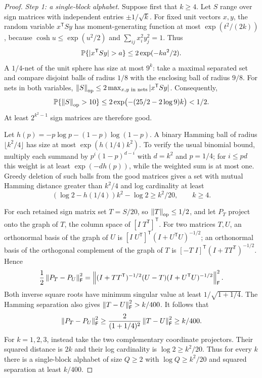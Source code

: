 \begin{proof}
\emph{Step 1: a single-block alphabet.}
Suppose first that $k\ge4$. Let $S$ range over sign matrices with independent
entries $\pm1/\sqrt{k}$. For fixed unit vectors $x,y$, the random variable
$x^{\mathsf T}Sy$ has moment-generating function at most
$\exp(t^2/(2k))$, because $\cosh u\le\exp(u^2/2)$ and
$\sum_{ij}x_i^2y_j^2=1$. Thus
\[
 \Prob\{|x^{\mathsf T}Sy|>a\}\le2\exp(-ka^2/2).
\]
A $1/4$-net of the unit sphere has size at most $9^k$: take a maximal separated
set and compare disjoint balls of radius $1/8$ with the enclosing ball of
radius $9/8$. For nets in both variables,
$\left\lVert S\right\rVert_{\mathrm{op}}\le2\max_{x,y\text{ in nets}}|x^{\mathsf T}Sy|$.
Consequently,
\[
 \mathbb P\{\left\lVert S\right\rVert_{\mathrm{op}}>10\}
 \le2\exp\bigl(-(25/2-2\log9)k\bigr)<1/2.
\]
At least $2^{k^2-1}$ sign matrices are therefore good.

Let $h(p)=-p\log p-(1-p)\log(1-p)$. A binary Hamming ball of radius
$\lfloor k^2/4\rfloor$ has size at most $\exp(h(1/4)k^2)$. To verify the usual
binomial bound, multiply each summand by
$p^i(1-p)^{d-i}$ with $d=k^2$ and $p=1/4$; for $i\le pd$ this weight is at
least $\exp(-dh(p))$, while the weighted sum is at most one.
Greedy deletion of such balls from the good matrices gives a set with mutual
Hamming distance greater than $k^2/4$ and log cardinality at least
\[
 (\log2-h(1/4))k^2-\log2\ge k^2/20,\qquad k\ge4.
\]

For each retained sign matrix set $T=S/20$, so $\left\lVert T\right\rVert_{\mathrm{op}}\le1/2$, and let
$P_T$ project onto the graph of $T$, the column space of
$[I\;T^{\mathsf T}]^{\mathsf T}$. For two matrices $T,U$, an orthonormal basis
of the graph of $U$ is
$[I\;U^{\mathsf T}]^{\mathsf T}(I+U^{\mathsf T}U)^{-1/2}$; an orthonormal
basis of the orthogonal complement of the graph of $T$ is
$[-T\;I]^{\mathsf T}(I+TT^{\mathsf T})^{-1/2}$. Hence
\begin{align}\label{eq:graphidentity}
 \frac12\left\lVert P_T-P_U\right\rVert_{\mathsf F}^2
 =\left\lVert (I+TT^{\mathsf T})^{-1/2}(U-T)
          (I+U^{\mathsf T}U)^{-1/2}\right\rVert_{\mathsf F}^2.
\end{align}
Both inverse square roots have minimum singular value at least
$1/\sqrt{1+1/4}$. The Hamming separation also gives
$\left\lVert T-U\right\rVert_{\mathsf F}^2>k/400$. It follows that
\[
 \left\lVert P_T-P_U\right\rVert_{\mathsf F}^2
 \ge\frac{2}{(1+1/4)^2}\left\lVert T-U\right\rVert_{\mathsf F}^2\ge k/400.
\]
For $k=1,2,3$, instead take the two complementary coordinate projectors.
Their squared distance is $2k$ and their log cardinality is $\log2\ge k^2/20$.
Thus for every $k$ there is a single-block alphabet of size $Q\ge2$ with
$\log Q\ge k^2/20$ and squared separation at least $k/400$.


\end{proof}

